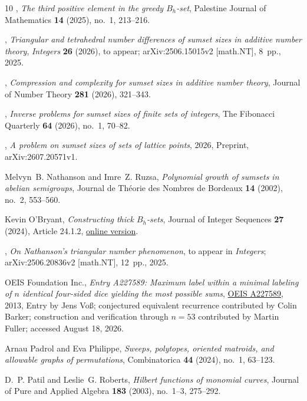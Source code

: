 \documentclass[11pt,reqno]{amsart}
\theoremstyle{definition}
\theoremstyle{remark}
\begin{document}
\begin{sloppypar}
\begin{thebibliography}{10}
\bysame, \emph{The third positive element in the greedy {$B_h$}-set}, Palestine Journal of Mathematics \textbf{14} (2025), no.~1, 213--216.

\bysame, \emph{Triangular and tetrahedral number differences of sumset sizes in additive number theory}, \emph{Integers} \textbf{26} (2026), to appear; arXiv:2506.15015v2 [math.NT], 8~pp., 2025.

\bysame, \emph{Compression and complexity for sumset sizes in additive number theory}, Journal of Number Theory \textbf{281} (2026), 321--343.

\bysame, \emph{Inverse problems for sumset sizes of finite sets of integers}, The Fibonacci Quarterly \textbf{64} (2026), no.~1, 70--82.

\bysame, \emph{A problem on sumset sizes of sets of lattice points}, 2026, Preprint, arXiv:2607.20571v1.

Melvyn~B. Nathanson and Imre~Z. Ruzsa, \emph{Polynomial growth of sumsets in abelian semigroups}, Journal de Th\'eorie des Nombres de Bordeaux \textbf{14} (2002), no.~2, 553--560.

Kevin O'Bryant, \emph{Constructing thick {$B_h$}-sets}, Journal of Integer Sequences \textbf{27} (2024), Article 24.1.2, \href{https://cs.uwaterloo.ca/journals/JIS/VOL27/OBryant/obry7.html} {online version}.

\bysame, \emph{On {Nathanson}'s triangular number phenomenon}, to appear in
\emph{Integers}; arXiv:2506.20836v2 [math.NT], 12~pp., 2025.

{OEIS Foundation Inc.}, \emph{Entry {A227589}: Maximum label within a minimal labeling of {$n$} identical four-sided dice yielding the most possible sums}, \href{https://oeis.org/A227589}{OEIS A227589}, 2013, Entry by Jens Vo{\ss}; conjectured equivalent recurrence contributed by Colin Barker; construction and verification through {$n=53$} contributed by Martin Fuller; accessed August 18, 2026.

Arnau Padrol and Eva Philippe, \emph{Sweeps, polytopes, oriented matroids, and allowable graphs of permutations}, Combinatorica \textbf{44} (2024), no.~1, 63--123.

D.~P. Patil and Leslie~G. Roberts, \emph{Hilbert functions of monomial curves}, Journal of Pure and Applied Algebra \textbf{183} (2003), no.~1--3, 275--292.


\end{thebibliography}
\end{sloppypar}
\end{document}
